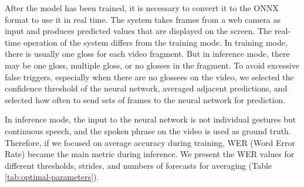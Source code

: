 \documentclass[]{spie}
\begin{document}
After the model has been trained, it is necessary to convert it to the ONNX format to use it in real time. The system takes frames from a web camera as input and produces predicted values that are displayed on the screen. The real-time operation of the system differs from the training mode. In training mode, there is usually one gloss for each video fragment. But in inference mode, there may be one gloss, multiple gloss, or no glosses in the fragment. To avoid excessive false triggers, especially when there are no glossees on the video, we selected the confidence threshold of the neural network, averaged adjacent predictions, and selected how often to send sets of frames to the neural network for prediction.

In inference mode, the input to the neural network is not individual gestures but continuous speech, and the spoken phrase on the video is used as ground truth. Therefore, if we focused on average accuracy during training, WER (Word Error Rate) became the main metric during inference. We present the WER values for different thresholds, strides, and numbers of forecasts for averaging (Table \ref{tab:optimal-parameters}). 
\end{document}
